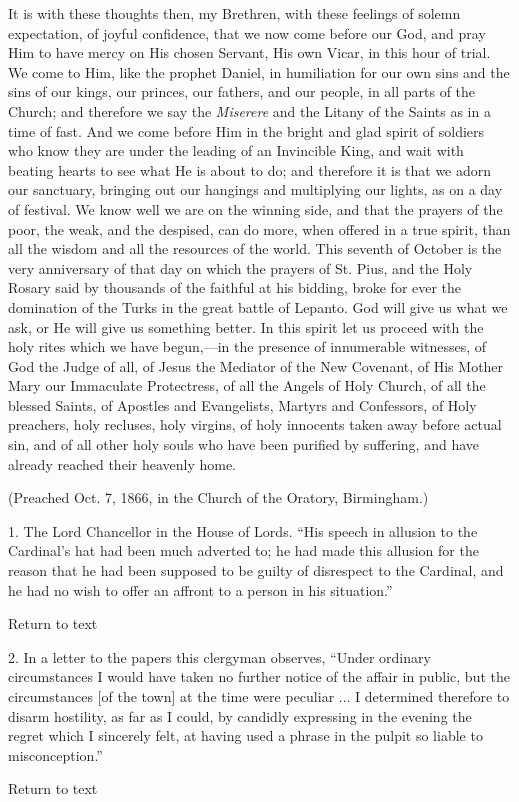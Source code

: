 It is with these thoughts then, my Brethren, with
these feelings of solemn expectation, of joyful
confidence, that we now come before our God, and pray Him
to have mercy on His chosen Servant, His own Vicar, in this hour of trial. We come to Him, like the prophet
Daniel, in humiliation for our own sins and the sins of
our kings, our princes, our fathers, and our people, in
all parts of the Church; and therefore we say the \emph{Miserere}
and the Litany of the Saints as in a time of fast. And we
come before Him in the bright and glad spirit of soldiers
who know they are under the leading of an Invincible
King, and wait with beating hearts to see what He is
about to do; and therefore it is that we adorn our
sanctuary, bringing out our hangings and multiplying our
lights, as on a day of festival. We know well we are on
the winning side, and that the prayers of the poor, the
weak, and the despised, can do more, when offered in a
true spirit, than all the wisdom and all the resources of
the world. This seventh of October is the very
anniversary of that day on which the prayers of St. Pius,
and the Holy Rosary said by thousands of the faithful at
his bidding, broke for ever the domination of the Turks
in the great battle of Lepanto. God will give us what we
ask, or He will give us something better. In this spirit
let us proceed with the holy rites which we have
begun,—in the presence of innumerable witnesses, of
God the Judge of all, of Jesus the Mediator of the New
Covenant, of His Mother Mary our Immaculate Protectress,
of all the Angels of Holy Church, of all the blessed
Saints, of Apostles and Evangelists, Martyrs and
Confessors, of Holy preachers, holy recluses, holy
virgins, of holy innocents taken away before actual sin,
and of all other holy souls who have been purified by
suffering, and have already reached their heavenly home.

(Preached Oct. 7, 1866, in the Church of the Oratory,
Birmingham.)






1. The Lord Chancellor in the
House of Lords. ``His speech in allusion to the
Cardinal's hat had been much adverted to; he had made this allusion for the reason that he had been supposed to
be guilty of disrespect to the Cardinal, and he had no
wish to offer an affront to a person in his
situation.''

Return to text


2. In a letter to the papers this
clergyman observes, ``Under ordinary circumstances I
would have taken no further notice of the affair in
public, but the circumstances [of the town] at the time
were peculiar ... I determined therefore to disarm
hostility, as far as I could, by candidly expressing in
the evening the regret which I sincerely felt, at having
used a phrase in the pulpit so liable to
misconception.''

Return to text
